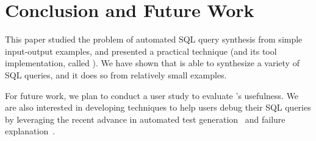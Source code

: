 \section{Conclusion and Future Work}
\label{sec:conclusion}




This paper studied the problem of automated SQL query synthesis
from simple input-output examples, and presented a
practical technique (and its tool implementation, called \ourtool).
We have shown that \ourtool is
able to synthesize a variety of SQL queries,
and it does so from relatively small examples.


For future work, we plan to conduct a user study
to evaluate \ourtool's usefulness. We are also 
interested in developing techniques to help users
debug their SQL queries by leveraging the recent
advance in automated test generation~\cite{ZhangSBE2011, Zhang:2010:TGV} and failure
explanation~\cite{ZhangZE2011, Zhang:2013:PST, Zhang:2011:LFP, Zhang:2008:EIF}.

\vspace{1mm}

\begin{comment}
Our future work will concentrate on the following topics:

\textbf{Enrich the supported SQL subset.} We plan to enrich the
supported SQL subset by \ourtool, and design a corresponding algorithm
to synthesize more general queries.

\textbf{Illustration of synthesis steps.} Besides
producing a final result, end-users may also be interested in knowing
how a SQL query is inferred step by step.
Showing detailed inference steps not
only makes \ourtool more usable, but also permits
end-users to better understand the whole process and
spot possible errors earlier.
We plan to apply recent advance in data visualization~\cite{Kandel:2011}
to the context of program synthesis.

\textbf{Noise detection and tolerance in users' inputs.} The current technique
requires users to provide noise-free input-output examples.
Even in the presence of a small amount of user-input noises (e.g., a typo),
the inference algorithm will declare failure when it fails to learn
a valid SQL query.
To overcome this limitation, we plan to design a more robust inference
algorithm that can attempt to identify and tolerate user-input noises,
and even suggest a fix to the noisy example.

\end{comment}


